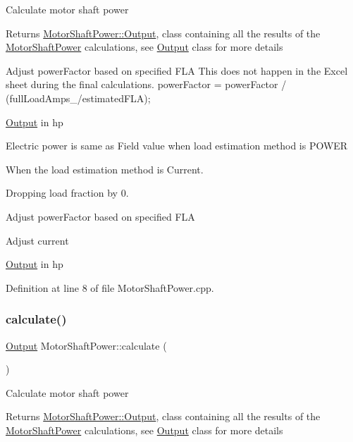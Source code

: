 Calculate motor shaft power \begin{DoxyReturn}{Returns}
\hyperlink{struct_motor_shaft_power_1_1_output}{Motor\+Shaft\+Power\+::\+Output}, class containing all the results of the \hyperlink{class_motor_shaft_power}{Motor\+Shaft\+Power} calculations, see \hyperlink{struct_motor_shaft_power_1_1_output}{Output} class for more details 
\end{DoxyReturn}
Adjust power\+Factor based on specified F\+LA This does not happen in the Excel sheet during the final calculations. power\+Factor = power\+Factor / (full\+Load\+Amps\+\_\+/estimated\+F\+LA);

\hyperlink{struct_motor_shaft_power_1_1_output}{Output} in hp

Electric power is same as Field value when load estimation method is P\+O\+W\+ER

When the load estimation method is Current.

Dropping load fraction by 0.

Adjust power\+Factor based on specified F\+LA

Adjust current

\hyperlink{struct_motor_shaft_power_1_1_output}{Output} in hp 

Definition at line 8 of file Motor\+Shaft\+Power.\+cpp.

\mbox{\label{class_motor_shaft_power_a1742d76cbea8f0469bf510238d183867}} 
\subsubsection{\texorpdfstring{calculate()}{calculate()}\hspace{0.1cm}{\footnotesize\ttfamily [2/3]}}
{\footnotesize\ttfamily \hyperlink{struct_motor_shaft_power_1_1_output}{Output} Motor\+Shaft\+Power\+::calculate (\begin{DoxyParamCaption}{ }\end{DoxyParamCaption})}

Calculate motor shaft power \begin{DoxyReturn}{Returns}
\hyperlink{struct_motor_shaft_power_1_1_output}{Motor\+Shaft\+Power\+::\+Output}, class containing all the results of the \hyperlink{class_motor_shaft_power}{Motor\+Shaft\+Power} calculations, see \hyperlink{struct_motor_shaft_power_1_1_output}{Output} class for more details 
\end{DoxyReturn}
\mbox{\label{class_motor_shaft_power_a1742d76cbea8f0469bf510238d183867}} 
